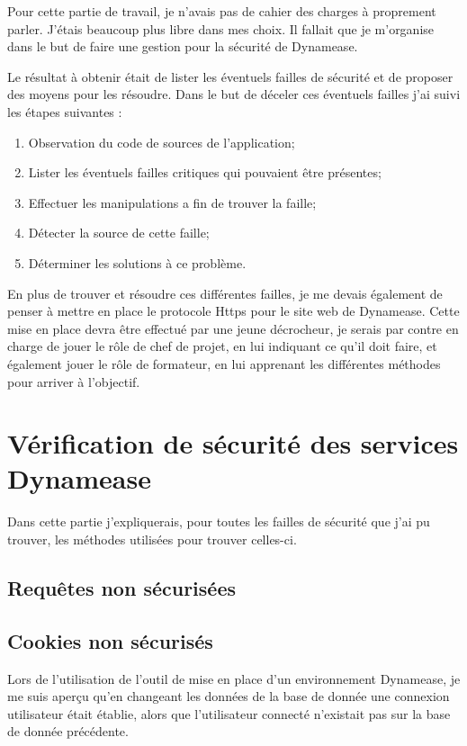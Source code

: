 Pour cette partie de travail, je n'avais pas de cahier des charges à proprement parler. J'étais beaucoup plus libre dans mes choix. Il fallait que je m'organise dans le but de faire une gestion pour la sécurité de Dynamease. 

Le résultat à obtenir était de lister les éventuels failles de sécurité et de proposer des moyens pour les résoudre. Dans le but de déceler ces éventuels failles j'ai suivi les étapes suivantes :

\begin{enumerate}
	\item Observation du code de sources de l'application;
	\item Lister les éventuels failles critiques qui pouvaient être présentes;
	\item Effectuer les manipulations a fin de trouver la faille;
	\item Détecter la source de cette faille;
	\item Déterminer les solutions à ce problème.
\end{enumerate} 

En plus de trouver et résoudre ces différentes failles, je me devais également de penser à mettre en place le protocole Https pour le site web de Dynamease. Cette mise en place devra être effectué par une jeune décrocheur, je serais par contre en charge de jouer le rôle de chef de projet, en lui indiquant ce qu'il doit faire, et également jouer le rôle de formateur, en lui apprenant les différentes méthodes pour arriver à l'objectif. 

\section{Vérification de sécurité des services Dynamease}

Dans cette partie j'expliquerais, pour toutes les failles de sécurité que j'ai pu trouver, les méthodes utilisées pour trouver celles-ci.

\subsection{Requêtes non sécurisées}

\subsection{Cookies non sécurisés}

Lors de l'utilisation de l'outil de mise en place d'un environnement Dynamease, je me suis aperçu qu'en changeant les données de la base de donnée une connexion utilisateur était établie, alors que l'utilisateur connecté n'existait pas sur la base de donnée précédente.

